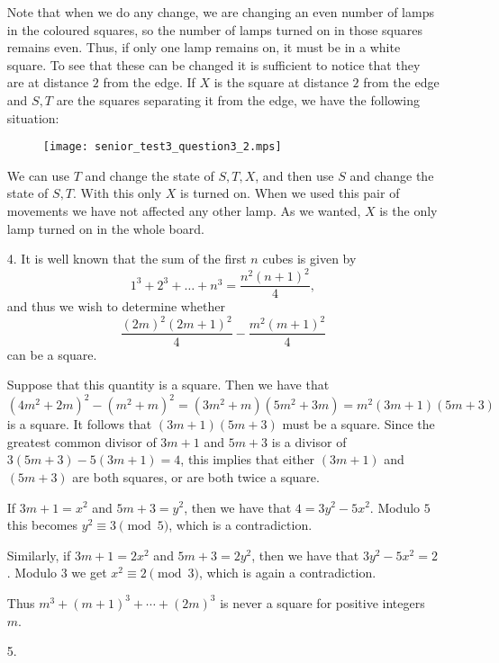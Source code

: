 \documentclass[a4paper, 12pt]{article}
\begin{document}
\begin{enumerate}
Note that when we do any change, we are changing an even number of lamps in the coloured squares, so the number of lamps turned on in those squares remains even. Thus, if only one lamp remains on, it must be in a white square. To see that these can be changed it is sufficient to notice that they are at distance $2$ from the edge. If $X$ is the square at distance $2$ from the edge and $S, T$ are the squares separating it from the edge, we have the following situation:

\begin{figure}[H]
\centering
\texttt{[image: senior\_test3\_question3\_2.mps]}
\end{figure}

We can use $T$ and change the state of $S, T, X$, and then use $S$ and change the state of $S, T$. With this only $X$ is turned on. When we used this pair of movements we have not affected any other lamp. As we wanted, $X$ is the only lamp turned on in the whole board.

\item[4.]
It is well known that the sum of the first $n$ cubes is given by
\[
	1^3 + 2^3 + \dots + n^3 = \frac{n^2 {(n + 1)}^2}{4},
\]
and thus we wish to determine whether
\[
	\frac{{(2m)}^2 {(2m + 1)}^2}{4} - \frac{m^2 {(m + 1)}^2}{4}
\]
can be a square.

Suppose that this quantity is a square. Then we have that
\[
	{(4m^2 + 2m)}^2 - {(m^2 + m)}^2 = (3m^2 + m)(5m^2 + 3m) = m^2 (3m + 1)(5m + 3)
\]
is a square. It follows that $(3m + 1)(5m + 3)$ must be a square. Since the greatest common divisor of $3m + 1$ and $5m + 3$ is a divisor of $3(5m + 3) - 5(3m + 1) = 4$, this implies that either $(3m + 1)$ and $(5m + 3)$ are both squares, or are both twice a square.

If $3m + 1 = x^2$ and $5m + 3 = y^2$, then we have that $4 = 3y^2 - 5x^2$. Modulo $5$ this becomes $y^2 \equiv 3 \pmod 5$, which is a contradiction.

Similarly, if $3m + 1 = 2x^2$ and $5m + 3 = 2y^2$, then we have that $3y^2 - 5x^2 = 2$. Modulo $3$ we get $x^2 \equiv 2 \pmod 3$, which is again a contradiction.

Thus $m^3 + {(m + 1)}^3 + \cdots + {(2m)}^3$ is never a square for positive integers $m$.

\item[5.]

\end{enumerate}
\end{document}
